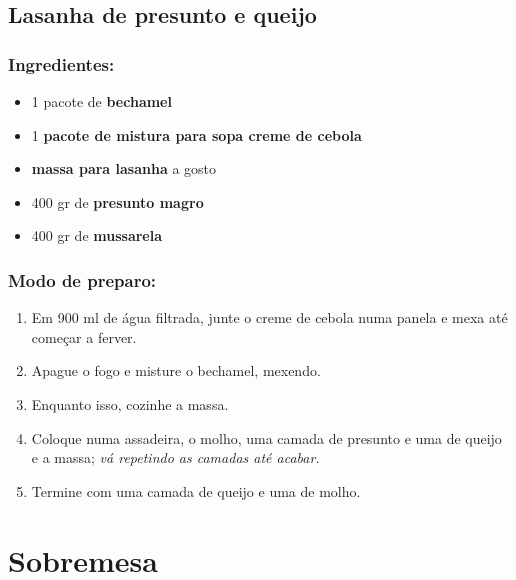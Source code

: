 \documentclass{report}
\begin{document}
\section{Lasanha de presunto e queijo}

\subsection{Ingredientes:}


\begin{itemize}
\item 1 pacote de \textbf{bechamel}

\item 1 \textbf{pacote de mistura para sopa creme de cebola}

\item  \textbf{massa para lasanha} a gosto

\item 400 gr de \textbf{presunto magro}

\item 400 gr de \textbf{mussarela}

\end{itemize}


\subsection{Modo de preparo:}


\begin{enumerate}

\item Em 900 ml de água filtrada, junte o creme de cebola numa panela e mexa até começar a ferver.

\item Apague o fogo e misture o bechamel, mexendo.

\item Enquanto isso, cozinhe a massa.

\item Coloque numa assadeira, o molho, uma camada de presunto e uma de queijo e a massa; \textit{vá repetindo as camadas até acabar.}

\item Termine com uma camada de queijo e uma de molho.
\end{enumerate}




\newpage

\chapter{Sobremesa}
\end{document}
